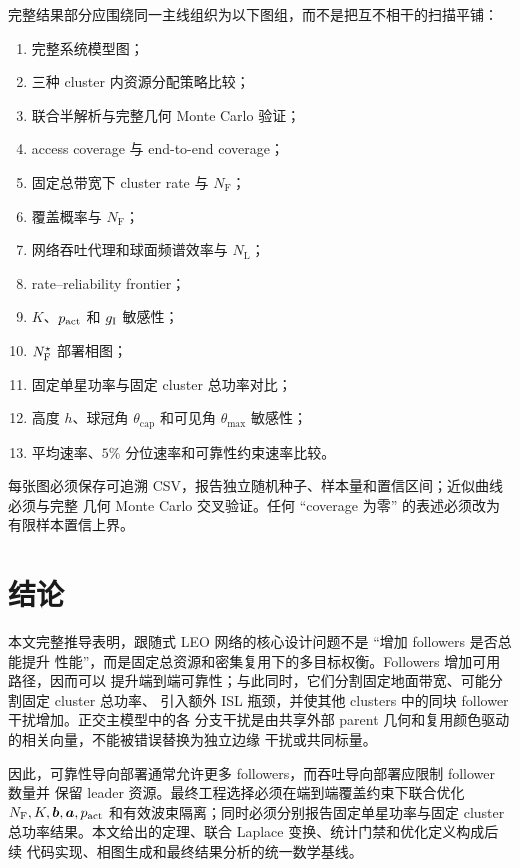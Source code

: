 \documentclass[UTF8,a4paper,11pt]{ctexart}
\newcommand{\NL}{N_{\mathrm L}}
\newcommand{\NF}{N_{\mathrm F}}
\newcommand{\thetam}{\theta_{\max}}
\newcommand{\thetac}{\theta_{\mathrm{cap}}}
\newcommand{\bvec}{\bm b}
\newcommand{\avec}{\bm a}
\begin{document}
完整结果部分应围绕同一主线组织为以下图组，而不是把互不相干的扫描平铺：
\begin{enumerate}[leftmargin=2em]
  \item 完整系统模型图；
  \item 三种 cluster 内资源分配策略比较；
  \item 联合半解析与完整几何 Monte Carlo 验证；
  \item access coverage 与 end-to-end coverage；
  \item 固定总带宽下 cluster rate 与 $\NF$；
  \item 覆盖概率与 $\NF$；
  \item 网络吞吐代理和球面频谱效率与 $\NL$；
  \item rate--reliability frontier；
  \item $K$、$p_{\rm act}$ 和 $g_{\rm I}$ 敏感性；
  \item $N_{\rm F}^{\star}$ 部署相图；
  \item 固定单星功率与固定 cluster 总功率对比；
  \item 高度 $h$、球冠角 $\thetac$ 和可见角 $\thetam$ 敏感性；
  \item 平均速率、$5\%$ 分位速率和可靠性约束速率比较。
\end{enumerate}
每张图必须保存可追溯 CSV，报告独立随机种子、样本量和置信区间；近似曲线必须与完整
几何 Monte Carlo 交叉验证。任何 ``coverage 为零'' 的表述必须改为有限样本置信上界。

\section{结论}

本文完整推导表明，跟随式 LEO 网络的核心设计问题不是 ``增加 followers 是否总能提升
性能''，而是固定总资源和密集复用下的多目标权衡。Followers 增加可用路径，因而可以
提升端到端可靠性；与此同时，它们分割固定地面带宽、可能分割固定 cluster 总功率、
引入额外 ISL 瓶颈，并使其他 clusters 中的同块 follower 干扰增加。正交主模型中的各
分支干扰是由共享外部 parent 几何和复用颜色驱动的相关向量，不能被错误替换为独立边缘
干扰或共同标量。

因此，可靠性导向部署通常允许更多 followers，而吞吐导向部署应限制 follower 数量并
保留 leader 资源。最终工程选择必须在端到端覆盖约束下联合优化
$\NF,K,\bvec,\avec,p_{\rm act}$ 和有效波束隔离；同时必须分别报告固定单星功率与固定
cluster 总功率结果。本文给出的定理、联合 Laplace 变换、统计门禁和优化定义构成后续
代码实现、相图生成和最终结果分析的统一数学基线。
\end{document}

